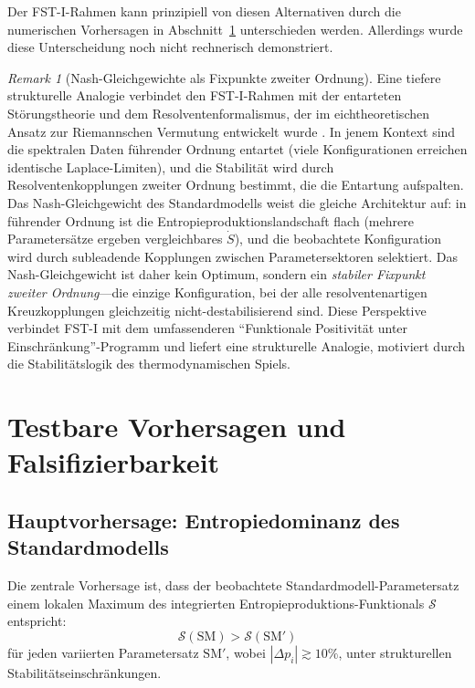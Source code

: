 \documentclass[12pt,a4paper]{article}
\theoremstyle{remark}
\newtheorem{remark}{Remark}
\begin{document}
Der FST-I-Rahmen kann prinzipiell von diesen Alternativen durch die numerischen Vorhersagen in Abschnitt~\ref{sec:predictions} unterschieden werden. Allerdings wurde diese Unterscheidung noch nicht rechnerisch demonstriert.

\begin{remark}[Nash-Gleichgewichte als Fixpunkte zweiter Ordnung]
\label{rem:degenerate-perturbation}
Eine tiefere strukturelle Analogie verbindet den FST-I-Rahmen mit der entarteten St\"orungstheorie und dem Resolventenformalismus, der im eichtheoretischen Ansatz zur Riemannschen Vermutung entwickelt wurde \citep{GeigerRH2026b}. In jenem Kontext sind die spektralen Daten f\"uhrender Ordnung entartet (viele Konfigurationen erreichen identische Laplace-Limiten), und die Stabilit\"at wird durch Resolventenkopplungen zweiter Ordnung bestimmt, die die Entartung aufspalten. Das Nash-Gleichgewicht des Standardmodells weist die gleiche Architektur auf: in f\"uhrender Ordnung ist die Entropieproduktionslandschaft flach (mehrere Parametersätze ergeben vergleichbares $\dot{S}$), und die beobachtete Konfiguration wird durch subleadende Kopplungen zwischen Parametersektoren selektiert. Das Nash-Gleichgewicht ist daher kein Optimum, sondern ein \emph{stabiler Fixpunkt zweiter Ordnung}---die einzige Konfiguration, bei der alle resolventenartigen Kreuzkopplungen gleichzeitig nicht-destabilisierend sind. Diese Perspektive verbindet FST-I mit dem umfassenderen ``Funktionale Positivit\"at unter Einschr\"ankung''-Programm und liefert eine strukturelle Analogie, motiviert durch die Stabilit\"atslogik des thermodynamischen Spiels.
\end{remark}

\section{Testbare Vorhersagen und Falsifizierbarkeit}
\label{sec:predictions}

\subsection{Hauptvorhersage: Entropiedominanz des Standardmodells}

Die zentrale Vorhersage ist, dass der beobachtete Standardmodell-Parametersatz einem lokalen Maximum des integrierten Entropieproduktions-Funktionals $\mathcal{S}$ entspricht:
\begin{equation}
\mathcal{S}(\text{SM}) > \mathcal{S}(\text{SM}')
\end{equation}
f\"ur jeden variierten Parametersatz $\text{SM}'$, wobei $|\Delta p_i| \gtrsim 10\%$, unter strukturellen Stabilit\"atseinschr\"ankungen.
\end{document}
